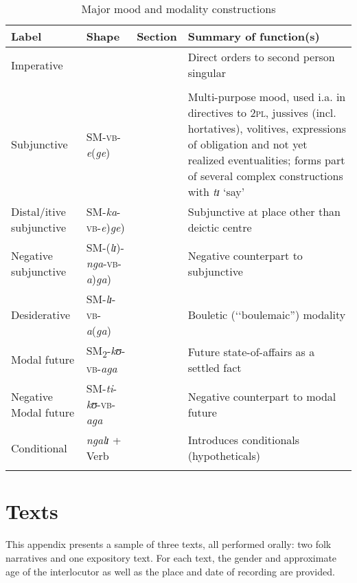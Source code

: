 \begin{sidewaystable}
	\begin{tabularx}{\textwidth}{lllX}
		\lsptoprule
		\footnotesize{Label} & \footnotesize{Shape} &\footnotesize{Section} & \footnotesize{Summary of function(s)}\\
		\midrule
		Imperative & 
		&  & Direct orders to second person singular\\
		& & & \\
		Subjunctive & SM-\textsc{vb}-\textit{e}(\textit{ge}) &  & Multi-purpose mood, used i.a. in directives to \textsc{2pl}, jussives (incl. hortatives), volitives, expressions of obligation and not yet realized eventualities; forms part of several complex constructions with \textit{tɪ} \lq say'\\
		Distal/itive subjunctive & SM-\textit{ka}-\textsc{vb}-\textit{e})\textit{ge}) &  & Subjunctive at place other than deictic centre\\
		Negative subjunctive & SM-(\textit{lɪ})-\textit{nga}-\textsc{vb}-\textit{a})\textit{ga}) &  & Negative counterpart to subjunctive\\
		Desiderative & SM-\textit{lɪ}-\textsc{vb}-\textit{a}(\textit{ga}) &  & Bouletic (\lq\lq boulemaic'') modality\\
		Modal future & SM\textsubscript{2}-\textit{kʊ}-\textsc{vb}-\textit{aga} &  & Future state-of-affairs as a settled fact \\
		Negative Modal future & SM-\textit{ti}-\textit{kʊ}-\textsc{vb}-\textit{aga} &  & Negative counterpart to modal future \\
		Conditional & \textit{ngalɪ} + Verb &  & Introduces conditionals (hypotheticals)\\
		\lspbottomrule
	\end{tabularx}	
	\caption{Major mood and modality constructions}\label{tabAppendixModal}
\end{sidewaystable}	


\cleardoublepage

\chapter{Texts}
This appendix presents a sample of three texts, all performed orally: two folk narratives and one expository text. For each text, the gender and approximate age of the interlocutor as well as the place and date of recording are provided.

